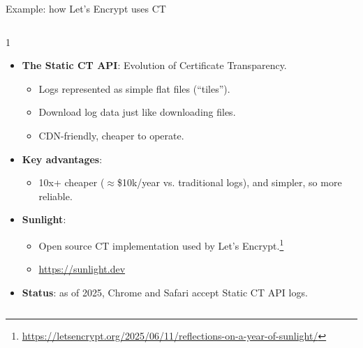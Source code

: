 \ifdefined\PRESENTATION\else\PassOptionsToClass{handout}{beamer}\fi\documentclass[aspectratio=169, lualatex]{beamer}
\begin{document}
\begin{frame}{Example: how Let's Encrypt uses CT}
	\begin{columns}[c]
		\begin{column}{1\textwidth}
			\begin{itemize}
				\item \textbf{The Static CT API}: Evolution of Certificate Transparency.
				      \begin{itemize}
					      \item Logs represented as simple flat files (``tiles'').
					      \item Download log data just like downloading files.
					      \item CDN-friendly, cheaper to operate.
				      \end{itemize}
				\item \textbf{Key advantages}:
				      \begin{itemize}
					      \item 10x+ cheaper ($\approx$\$10k/year vs. traditional logs), and simpler, so more reliable.
				      \end{itemize}
				\item \textbf{Sunlight}:
				      \begin{itemize}
					      \item Open source CT implementation used by Let's Encrypt.\footnote{\url{https://letsencrypt.org/2025/06/11/reflections-on-a-year-of-sunlight/}}
					      \item \url{https://sunlight.dev}
				      \end{itemize}
				\item \textbf{Status}: as of 2025, Chrome and Safari accept Static CT API logs.
			\end{itemize}
		\end{column}
	\end{columns}
\end{frame}
\end{document}

